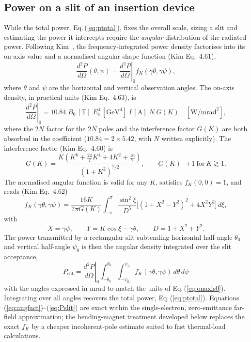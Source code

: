 \documentclass[11pt,a4paper]{article}
\begin{document}
\subsection{Power on a slit of an insertion device}
While the total power, Eq.\,(\ref{eq:ptotal}), fixes the overall scale, sizing a slit and
estimating the power it intercepts require the \emph{angular} distribution of the radiated
power.  Following Kim~\cite{kim1989}, the frequency-integrated power density factorises into
its on-axis value and a normalised angular shape function (Kim Eq.~4.61),
\begin{equation}
  \frac{d^2P}{d\Omega}(\theta,\psi)
    = \left.\frac{d^2P}{d\Omega}\right|_0 f_K(\gamma\theta,\gamma\psi),
  \label{eq:angfact}
\end{equation}
where $\theta$ and $\psi$ are the horizontal and vertical observation angles.  The on-axis
density, in practical units (Kim Eq.~4.63), is
\begin{equation}
  \left.\frac{d^2P}{d\Omega}\right|_0
    = 10.84\; B_0\,[\text{T}]\; E_e^4\,[\text{GeV}^4]\; I\,[\text{A}]\; N\; G(K)
    \quad [\text{W/mrad}^2],
  \label{eq:onaxis0}
\end{equation}
where the $2N$ factor for the $2N$ poles and the interference factor $G(K)$ are both absorbed
in the coefficient ($10.84 = 2\times5.42$, with $N$ written explicitly).  The interference
factor (Kim Eq.~4.60) is
\begin{equation}
  G(K) = \frac{K\!\left(K^6 + \tfrac{24}{7}K^4 + 4K^2 + \tfrac{16}{7}\right)}
              {\left(1+K^2\right)^{7/2}},
  \qquad G(K)\to 1 \ \text{for}\ K\gtrsim1.
  \label{eq:GK}
\end{equation}
The normalised angular function is valid for any $K$, satisfies $f_K(0,0)=1$, and reads
(Kim Eq.~4.62)
\begin{equation}
  f_K(\gamma\theta,\gamma\psi)
    = \frac{16K}{7\pi G(K)}\int_{-\pi}^{\pi}
      \frac{\sin^2\xi}{D^5}\Big[(1+X^2-Y^2)^2 + 4X^2Y^2\Big]\,d\xi,
  \label{eq:fK}
\end{equation}
with
\begin{equation}
  X = \gamma\psi,\qquad Y = K\cos\xi - \gamma\theta,\qquad D = 1 + X^2 + Y^2.
  \label{eq:XYD}
\end{equation}
The power transmitted by a rectangular slit subtending horizontal half-angle $\theta_0$ and
vertical half-angle $\psi_0$ is then the angular density integrated over the slit acceptance,
\begin{equation}
  \boxed{\;P_\text{slit}
    = \left.\frac{d^2P}{d\Omega}\right|_0
      \int_{-\theta_0}^{\theta_0}\!\!\int_{-\psi_0}^{\psi_0}
      f_K(\gamma\theta,\gamma\psi)\,d\theta\,d\psi\;}
  \label{eq:Pslit}
\end{equation}
with the angles expressed in mrad to match the units of Eq.\,(\ref{eq:onaxis0}).  Integrating
over all angles recovers the total power, Eq.\,(\ref{eq:ptotal}).  Equations
(\ref{eq:angfact})--(\ref{eq:Pslit}) are exact within the single-electron, zero-emittance
far-field approximation; the bending-magnet treatment developed below replaces the exact
$f_K$ by a cheaper incoherent-pole estimate suited to fast thermal-load calculations.
\end{document}
